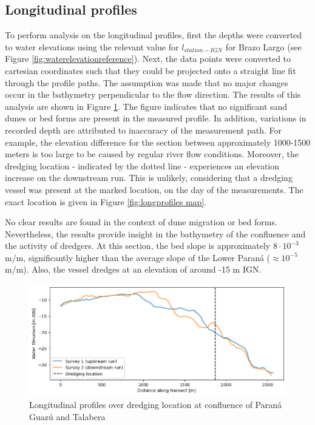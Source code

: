 \subsection{Longitudinal profiles}
\label{sec: Longitudinal profiles}
To perform analysis on the longitudinal profiles, first the depths were converted to water elevations using the relevant value for $l_{station-IGN}$ for Brazo Largo (see Figure \ref{fig:waterelevationreference}). Next, the data points were converted to cartesian coordinates such that they could be projected onto a straight line fit through the profile paths. The assumption was made that no major changes occur in the bathymetry perpendicular to the flow direction. The results of this analysis are shown in Figure \ref{fig:longitudinal profiles}. The figure indicates that no significant sand dunes or bed forms are present in the measured profile. In addition, variations in recorded depth are attributed to inaccuracy of the measurement path. For example, the elevation difference for the section between approximately 1000-1500 meters is too large to be caused by regular river flow conditions. Moreover, the dredging location - indicated by the dotted line - experiences an elevation increase on the downstream run. This is unlikely, considering that a dredging vessel was present at the marked location, on the day of the measurements. The exact location is given in Figure \ref{fig:longprofiles map}.

No clear results are found in the context of dune migration or bed forms. Nevertheless, the results provide insight in the bathymetry of the confluence and the activity of dredgers. At this section, the bed slope is approximately $8 \cdot 10^{-3}$ m/m, significantly higher than the average slope of the Lower Paraná ($\approx 10^{-5}$ m/m). Also, the vessel dredges at an elevation of around -15 m IGN. 

\begin{figure}[H]
    \centering
    \includegraphics[width=0.75\linewidth]{figures/ch6/longitudinal profiles.png}
    \caption{Longitudinal profiles over dredging location at confluence of Paraná Guazú and Talabera}
    \label{fig:longitudinal profiles}
\end{figure}


